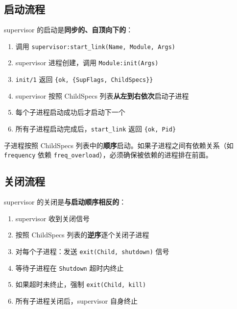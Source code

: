 \documentclass[a4paper,11pt]{article}
\begin{document}
\subsection{启动流程}

supervisor 的启动是\textbf{同步的、自顶向下的}：

\begin{enumerate}[leftmargin=2em]
    \item 调用 \texttt{supervisor:start\_link(Name, Module, Args)}
    \item supervisor 进程创建，调用 \texttt{Module:init(Args)}
    \item \texttt{init/1} 返回 \texttt{\{ok, \{SupFlags, ChildSpecs\}\}}
    \item supervisor 按照 ChildSpecs 列表\textbf{从左到右依次}启动子进程
    \item 每个子进程启动成功后才启动下一个
    \item 所有子进程启动完成后，\texttt{start\_link} 返回 \texttt{\{ok, Pid\}}
\end{enumerate}

\begin{warnbox}[注意：启动顺序很重要]
子进程按照 ChildSpecs 列表中的\textbf{顺序}启动。如果子进程之间有依赖关系（如 \texttt{frequency} 依赖 \texttt{freq\_overload}），必须确保被依赖的进程排在前面。
\end{warnbox}

\subsection{关闭流程}

supervisor 的关闭是\textbf{与启动顺序相反的}：

\begin{enumerate}[leftmargin=2em]
    \item supervisor 收到关闭信号
    \item 按照 ChildSpecs 列表的\textbf{逆序}逐个关闭子进程
    \item 对每个子进程：发送 \texttt{exit(Child, shutdown)} 信号
    \item 等待子进程在 \texttt{Shutdown} 超时内终止
    \item 如果超时未终止，强制 \texttt{exit(Child, kill)}
    \item 所有子进程关闭后，supervisor 自身终止
\end{enumerate}


\end{document}
